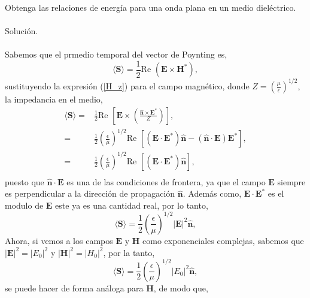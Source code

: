\documentclass[11pt,fleqn]{book} %
\begin{document}
\begin{example}
Obtenga las relaciones de energ\'ia para una onda plana en un medio diel\'ectrico.\\\\
Soluci\'on.\\\\

Sabemos que el prmedio temporal del vector de Poynting es,
\begin{equation*}
\langle \textbf{S} \rangle= \frac{1}{2}\text{Re  }(\textbf{E}\times \textbf{H}^{*}),
\end{equation*}
sustituyendo la expresi\'on (\ref{H_z}) para el campo magn\'etico, donde $Z=\left(\frac{\mu}{\epsilon}\right)^{1/2}$, la impedancia en el medio,
\begin{equation*}
\begin{split}
\langle \textbf{S} \rangle=&\frac{1}{2}\text{Re  }\left[ \textbf{E}\times \left( \frac{\hat{\textbf{n}}\times \textbf{E}^{*}}{Z} \right)\right],\\
=&\frac{1}{2}\left(\frac{\epsilon}{\mu}\right)^{1/2}\text{Re  }\left[  (\textbf{E}\cdot\textbf{E}^{*})\hat{\textbf{n}}-(\hat{\textbf{n}}\cdot\textbf{E})\textbf{E}^{*}  \right],\\
=&\frac{1}{2}\left(\frac{\epsilon}{\mu}\right)^{1/2}\text{Re  }\left[ (\textbf{E}\cdot\textbf{E}^{*})\hat{\textbf{n}} \right],\\
\end{split}
\end{equation*}
puesto que $\hat{\textbf{n}}\cdot\textbf{E}$ es una de las condiciones de frontera, ya que el campo $\textbf{E}$ siempre es perpendicular a la direcci\'on de propagaci\'on $\hat{\textbf{n}}$. Adem\'as como, $\textbf{E}\cdot\textbf{E}^{*}$ es el modulo de $\textbf{E}$ este ya es una cantidad real, por lo tanto,
\begin{equation*}
\langle \textbf{S} \rangle=\frac{1}{2}\left(\frac{\epsilon}{\mu}\right)^{1/2}|\textbf{E}|^2 \hat{\textbf{n}},
\end{equation*}
Ahora,  si vemos a los campos $\textbf{E}$ y $\textbf{H}$ como exponenciales complejas, sabemos que $|\textbf{E}|^2=|E_0|^2$ y $|\textbf{H}|^2=|H_0|^2$, por la tanto,
\begin{equation*}
\langle \textbf{S} \rangle=\frac{1}{2}\left(\frac{\epsilon}{\mu}\right)^{1/2}|E_0|^2 \hat{\textbf{n}},
\end{equation*}
se puede hacer de forma an\'aloga para $\textbf{H}$, de modo que,
\begin{equation*}

\end{equation*}
\end{example}
\end{document}
